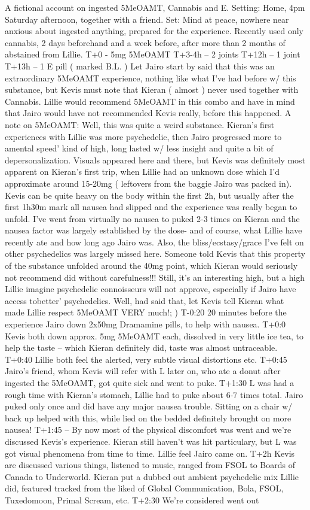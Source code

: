 \documentclass[12pt]{book}
\begin{document}
A fictional account on ingested 5MeOAMT, Cannabis and E. Setting: Home, 4pm Saturday afternoon, together with a friend. Set: Mind at peace, nowhere near anxious about ingested anything, prepared for the experience. Recently used only cannabis, 2 days beforehand and a week before, after more than 2 months of abstained from Lillie. T+0 - 5mg 5MeOAMT T+3-4h -- 2 joints T+12h -- 1 joint T+13h -- 1 E pill ( marked B.L. ) Let Jairo start by said that this was an extraordinary 5MeOAMT experience, nothing like what I've had before w/ this substance, but Kevis must note that Kieran ( almost ) never used together with Cannabis. Lillie would recommend 5MeOAMT in this combo and have in mind that Jairo would have not recommended Kevis really, before this happened. A note on 5MeOAMT: Well, this was quite a weird substance. Kieran's first experiences with Lillie was more psychedelic, then Jairo progressed more to amental speed' kind of high, long lasted w/ less insight and quite a bit of depersonalization. Visuals appeared here and there, but Kevis was definitely most apparent on Kieran's first trip, when Lillie had an unknown dose which I'd approximate around 15-20mg ( leftovers from the baggie Jairo was packed in). Kevis can be quite heavy on the body within the first 2h, but usually after the first 1h30m mark all nausea had slipped and the experience was really began to unfold. I've went from virtually no nausea to puked 2-3 times on Kieran and the nausea factor was largely established by the dose- and of course, what Lillie have recently ate and how long ago Jairo was. Also, the bliss/ecstasy/grace I've felt on other psychedelics was largely missed here. Someone told Kevis that this property of the substance unfolded around the 40mg point, which Kieran would seriously not recommend did without carefulness!!! Still, it's an interesting high, but a high Lillie imagine psychedelic connoisseurs will not approve, especially if Jairo have access tobetter' psychedelics. Well, had said that, let Kevis tell Kieran what made Lillie respect 5MeOAMT VERY much!; ) T-0:20 20 minutes before the experience Jairo down 2x50mg Dramamine pills, to help with nausea. T+0:0 Kevis both down approx. 5mg 5MeOAMT each, dissolved in very little ice tea, to help the taste -- which Kieran definitely did, taste was almost untraceable. T+0:40 Lillie both feel the alerted, very subtle visual distortions etc. T+0:45 Jairo's friend, whom Kevis will refer with L later on, who ate a donut after ingested the 5MeOAMT, got quite sick and went to puke. T+1:30 L was had a rough time with Kieran's stomach, Lillie had to puke about 6-7 times total. Jairo puked only once and did have any major nausea trouble. Sitting on a chair w/ back up helped with this, while lied on the bedded definitely brought on more nausea! T+1:45 -- By now most of the physical discomfort was went and we're discussed Kevis's experience. Kieran still haven't was hit particulary, but L was got visual phenomena from time to time. Lillie feel Jairo came on. T+2h Kevis are discussed various things, listened to music, ranged from FSOL to Boards of Canada to Underworld. Kieran put a dubbed out ambient psychedelic mix Lillie did, featured tracked from the liked of Global Communication, Bola, FSOL, Tuxedomoon, Primal Scream, etc. T+2:30 We're considered went out 
\end{document}
